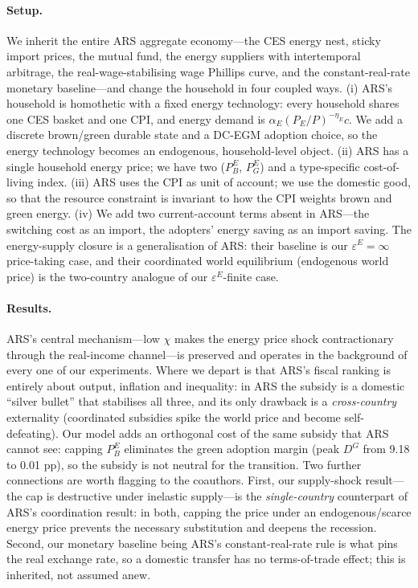 \documentclass[11pt,a4paper]{article}
\begin{document}
\paragraph{Setup.} We inherit the entire ARS aggregate economy---the CES
energy nest, sticky import prices, the mutual fund, the energy suppliers with
intertemporal arbitrage, the real-wage-stabilising wage Phillips curve, and the
constant-real-rate monetary baseline---and change the household in four coupled
ways. (i) ARS's household is homothetic with a fixed energy technology: every
household shares one CES basket and one CPI, and energy demand is
$\alpha_E(P_E/P)^{-\eta_E}c$. We add a discrete brown/green durable state and a
DC-EGM adoption choice, so the energy technology becomes an endogenous,
household-level object. (ii) ARS has a single household energy price; we have
two ($P^E_B$, $P^E_G$) and a type-specific cost-of-living index. (iii) ARS uses
the CPI as unit of account; we use the domestic good, so that the resource
constraint is invariant to how the CPI weights brown and green energy. (iv) We
add two current-account terms absent in ARS---the switching cost as an import,
the adopters' energy saving as an import saving. The energy-supply closure is a
generalisation of ARS: their baseline is our $\varepsilon^E=\infty$
price-taking case, and their coordinated world equilibrium (endogenous world
price) is the two-country analogue of our $\varepsilon^E$-finite case.

\paragraph{Results.} ARS's central mechanism---low $\chi$ makes the energy
price shock contractionary through the real-income channel---is preserved and
operates in the background of every one of our experiments. Where we depart is
that ARS's fiscal ranking is entirely about output, inflation and inequality:
in ARS the subsidy is a domestic ``silver bullet'' that stabilises all three,
and its only drawback is a \emph{cross-country} externality (coordinated
subsidies spike the world price and become self-defeating). Our model adds an
orthogonal cost of the same subsidy that ARS cannot see: capping $P^E_B$
eliminates the green adoption margin (peak $D^G$ from 9.18 to 0.01 pp), so the
subsidy is not neutral for the transition. Two further connections are worth
flagging to the coauthors. First, our supply-shock result---the cap is
destructive under inelastic supply---is the \emph{single-country} counterpart
of ARS's coordination result: in both, capping the price under an
endogenous/scarce energy price prevents the necessary substitution and deepens
the recession. Second, our monetary baseline being ARS's constant-real-rate
rule is what pins the real exchange rate, so a domestic transfer has no
terms-of-trade effect; this is inherited, not assumed anew.
\end{document}

